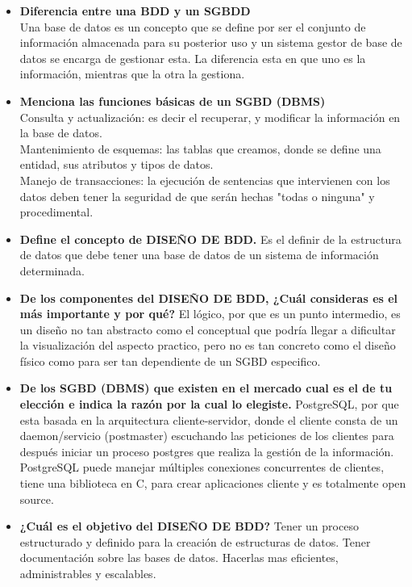 \documentclass[spanish,12pt,letterpapper]{article}
\begin{document}
	\begin{itemize}
	\item \textbf{Diferencia entre una BDD y un SGBDD\\}
	Una base de datos es un concepto que se define por ser el conjunto de información almacenada para su posterior uso y un sistema gestor de base de datos se encarga de gestionar esta. La diferencia esta en que uno es la información, mientras que la otra la gestiona.\\
	
\item \textbf{Menciona las funciones básicas de un SGBD (DBMS)\\}
Consulta y actualización: es decir el recuperar, y modificar la información en la base de datos.\\
Mantenimiento de esquemas: las tablas que creamos, donde se define una entidad, sus atributos y tipos de datos.\\
Manejo de transacciones: la ejecución de sentencias que intervienen con los datos deben tener la seguridad de que serán hechas "todas o ninguna" y procedimental.\\

\item \textbf{Define el concepto de DISEÑO DE BDD.}
Es el definir de la estructura de datos que debe tener una base de datos de un sistema de información determinada.\\

\item \textbf{De los componentes del DISEÑO DE BDD, ¿Cuál consideras es el más importante y por qué?}
El lógico, por que es un punto intermedio, es un diseño no tan abstracto como el conceptual que podría llegar a dificultar la visualización del aspecto practico, pero no es tan concreto como el diseño físico como para ser tan dependiente de un SGBD especifico.\\

\item \textbf{De los SGBD (DBMS) que existen en el mercado cual es el de tu elección e indica la razón por la cual lo elegiste.}
PostgreSQL, por que esta basada en la arquitectura cliente-servidor, donde el cliente consta de un daemon/servicio (postmaster) escuchando las peticiones de los clientes para después iniciar un proceso postgres que realiza la gestión de la información. PostgreSQL puede manejar múltiples conexiones concurrentes de clientes, tiene una biblioteca en C, para crear aplicaciones cliente y es totalmente open source.\\

\item \textbf{¿Cuál es el objetivo del DISEÑO DE BDD?}
Tener un proceso estructurado y definido para la creación de estructuras de datos. Tener documentación sobre las bases de datos. Hacerlas mas eficientes, administrables y escalables. 

	\end{itemize}
	
\end{document}
